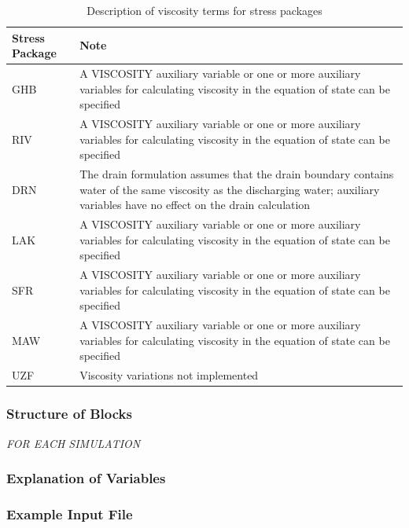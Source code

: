 \begin{longtable}{p{3cm} p{12cm}}
\caption{Description of viscosity terms for stress packages}
\tabularnewline
\hline
\hline
\textbf{Stress Package} & \textbf{Note} \\
\hline
\endhead
\hline
\endfoot
GHB & A VISCOSITY auxiliary variable or one or more auxiliary variables for calculating viscosity in the equation of state can be specified \\
RIV & A VISCOSITY auxiliary variable or one or more auxiliary variables for calculating viscosity in the equation of state can be specified \\
DRN & The drain formulation assumes that the drain boundary contains water of the same viscosity as the discharging water; auxiliary variables have no effect on the drain calculation  \\
LAK & A VISCOSITY auxiliary variable or one or more auxiliary variables for calculating viscosity in the equation of state can be specified \\
SFR & A VISCOSITY auxiliary variable or one or more auxiliary variables for calculating viscosity in the equation of state can be specified \\
MAW & A VISCOSITY auxiliary variable or one or more auxiliary variables for calculating viscosity in the equation of state can be specified \\
UZF & Viscosity variations not implemented \\
\end{longtable}

\vspace{5mm}
\subsubsection{Structure of Blocks}

\vspace{5mm}
\noindent \textit{FOR EACH SIMULATION}




\vspace{5mm}
\subsubsection{Explanation of Variables}
\begin{description}

\end{description}

\vspace{5mm}
\subsubsection{Example Input File}

